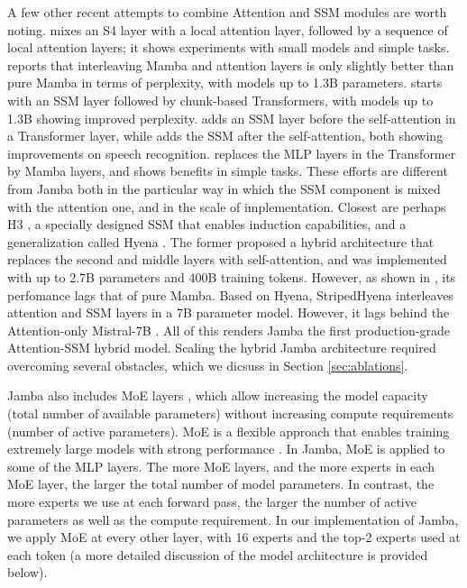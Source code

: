 \documentclass{article}
\def\jamba{Jamba\xspace}
\begin{document}
A few other recent attempts to combine Attention and SSM modules are worth noting. 
\cite{zuo2022efficient} mixes an S4 layer \cite{gu2021efficiently} with a local attention layer, followed by a sequence of local attention layers; it shows experiments with small models and simple tasks. 
\cite{gu2023mamba} reports that interleaving Mamba and attention layers is only slightly better than pure Mamba in terms of perplexity, with models up to 1.3B parameters. 
\cite{pilault2023block} starts with an SSM layer followed by chunk-based Transformers, with models up to 1.3B showing improved perplexity. 
\cite{fathullah23_interspeech} adds an SSM layer before the self-attention in a Transformer layer, while \cite{saon2023diagonal} adds the SSM after the self-attention, both showing improvements on speech recognition. 
\cite{park2024can} replaces the MLP layers in the Transformer by Mamba layers, and shows benefits in simple tasks. These efforts are different from \jamba both in the particular way in which the SSM component is mixed with the attention one, and in the scale of implementation. Closest are perhaps H3 \cite{fu2022hungry}, a specially designed SSM that enables induction capabilities, and a generalization called Hyena \cite{poli2023hyena}. The former proposed a hybrid architecture that replaces the second and middle layers with self-attention, and  was implemented with up to 2.7B parameters and 400B training tokens. However, as shown in \cite{gu2023mamba}, its perfomance lags that of pure Mamba.
Based on Hyena, StripedHyena \cite{stripedhyena} interleaves attention and SSM layers in a 7B parameter model. However, it lags behind the Attention-only Mistral-7B \cite{jiang2023mistral}. 
All of this renders \jamba the first production-grade Attention-SSM hybrid model.
Scaling the hybrid \jamba architecture required overcoming several obstacles, which we dicsuss in Section \ref{sec:ablations}. 

\jamba also includes MoE layers \cite{shazeer2016outrageously,fedus2022switch}, which allow increasing the model capacity (total number of available parameters) without increasing compute requirements (number of active parameters). MoE is a flexible approach that enables training extremely large models with strong performance \cite{jiang2024mixtral}. In \jamba, MoE is applied to some of the MLP layers. The more MoE layers, and the more experts in each MoE layer, the larger the total number of model parameters. In contrast, the more experts we use at each forward pass, the larger the number of active parameters as well as the compute requirement. In our implementation of \jamba, we apply MoE at  every other layer, with 16 experts and the top-2 experts used at each token (a more detailed discussion of the model architecture is provided below).
\end{document}
